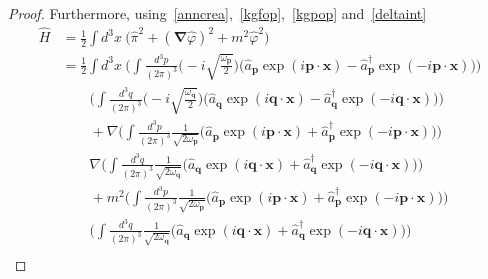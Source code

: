 \begin{proof}
        Furthermore, using~\eqref{anncrea},~\eqref{kgfop},~\eqref{kgpop} and~\eqref{deltaint}
        \begin{equation*}
        \begin{aligned}
            \hat H & = \frac{1}{2} \int d^3 x ~ \Big (\hat \pi^2 + (\boldsymbol \nabla \hat \varphi)^2 + m^2 \hat \varphi^2) \\ & = \frac{1}{2} \int d^3 x ~ (\int \frac{d^3 p}{{(2\pi)}^3} \Big (- i\sqrt{\frac{\omega_{\mathbf p}}{2}} \Big ) \Big (\hat a_{\mathbf p} \exp(i \mathbf p \cdot \mathbf x) - \hat a_{\mathbf p}^\dagger \exp(- i \mathbf p \cdot \mathbf x) \Big) \Big ) \\ & \qquad \Big (\int \frac{d^3 q}{{(2\pi)}^3} \Big (- i\sqrt{\frac{\omega_{\mathbf q}}{2}} \Big ) \Big (\hat a_{\mathbf q} \exp(i \mathbf q \cdot \mathbf x) - \hat a_{\mathbf q}^\dagger \exp(- i \mathbf q \cdot \mathbf x) \Big) \Big ) \\ & \qquad + \nabla \Big ( \int \frac{d^3 p}{{(2\pi)}^3} \frac{1}{\sqrt{2 \omega_{\mathbf p}}} \Big (\hat a_{\mathbf p} \exp(i \mathbf p \cdot \mathbf x) + \hat a_{\mathbf p}^\dagger \exp(- i \mathbf p \cdot \mathbf x) \Big) \Big) \\ & \qquad \nabla \Big ( \int \frac{d^3 q}{{(2\pi)}^3} \frac{1}{\sqrt{2 \omega_{\mathbf q}}} \Big (\hat a_{\mathbf q} \exp(i \mathbf q \cdot \mathbf x) + \hat a_{\mathbf q}^\dagger \exp(- i \mathbf q \cdot \mathbf x) \Big) \Big) \\ & \qquad + m^2 \Big (\int \frac{d^3 p}{{(2\pi)}^3} \frac{1}{\sqrt{2 \omega_{\mathbf p}}} \Big (\hat a_{\mathbf p} \exp(i \mathbf p \cdot \mathbf x) + \hat a_{\mathbf p}^\dagger \exp(- i \mathbf p \cdot \mathbf x) \Big) \Big ) \\ & \qquad \Big ( \int \frac{d^3 q}{{(2\pi)}^3} \frac{1}{\sqrt{2 \omega_{\mathbf q}}} \Big (\hat a_{\mathbf q} \exp(i \mathbf q \cdot \mathbf x) + \hat a_{\mathbf q}^\dagger \exp(- i \mathbf q \cdot \mathbf x) \Big) \Big)
        \end{aligned}
        \end{equation*}
        \begin{equation*}
        \begin{aligned}

\end{aligned}
\end{equation*}
\end{proof}
